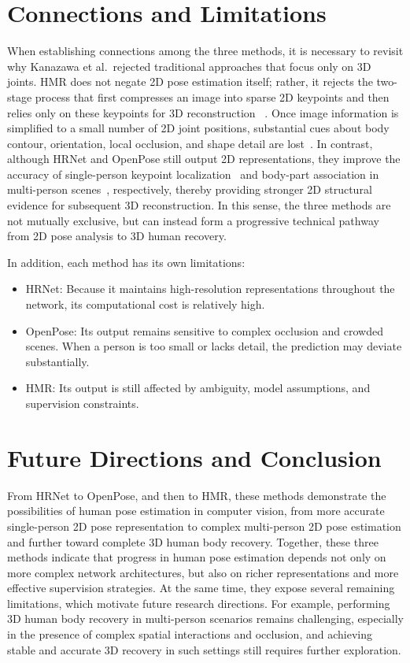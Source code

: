 \documentclass[conference]{IEEEtran}
\begin{document}
\section{Connections and Limitations}
When establishing connections among the three methods, it is necessary to
revisit why Kanazawa et al.\ rejected traditional approaches that focus only
on 3D joints. HMR does not negate 2D pose estimation itself; rather, it
rejects the two-stage process that first compresses an image into sparse 2D
keypoints and then relies only on these keypoints for 3D reconstruction
~\cite{kanazawa2018hmr}. Once image information is simplified to a small number
of 2D joint positions, substantial cues about body contour, orientation, local
occlusion, and shape detail are lost~\cite{kanazawa2018hmr}. In contrast,
although HRNet and OpenPose still output 2D representations, they improve the
accuracy of single-person keypoint localization~\cite{sun2019hrnet} and
body-part association in multi-person scenes~\cite{cao2019openpose},
respectively, thereby providing stronger 2D structural evidence for subsequent
3D reconstruction. In this sense, the three methods are not mutually
exclusive, but can instead form a progressive technical pathway from 2D pose
analysis to 3D human recovery.

In addition, each method has its own limitations:
\begin{itemize}
    \item HRNet: Because it maintains high-resolution representations throughout
    the network, its computational cost is relatively high.
    \item OpenPose: Its output remains sensitive to complex occlusion and
    crowded scenes. When a person is too small or lacks detail, the prediction
    may deviate substantially.
    \item HMR: Its output is still affected by ambiguity, model assumptions,
    and supervision constraints.
\end{itemize}


\section{Future Directions and Conclusion}
From HRNet to OpenPose, and then to HMR, these methods demonstrate the
possibilities of human pose estimation in computer vision, from more accurate
single-person 2D pose representation to complex multi-person 2D pose
estimation and further toward complete 3D human body recovery. Together, these
three methods indicate that progress in human pose estimation depends not only
on more complex network architectures, but also on richer representations and
more effective supervision strategies. At the same time, they expose several
remaining limitations, which motivate future research directions. For example,
performing 3D human body recovery in multi-person scenarios remains
challenging, especially in the presence of complex spatial interactions and
occlusion, and achieving stable and accurate 3D recovery in such settings
still requires further exploration.


\nocite{cao2019openpose,sun2019hrnet,kanazawa2018hmr}

{\footnotesize


}
\end{document}
